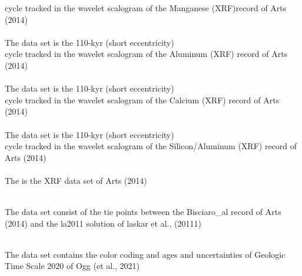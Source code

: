 \documentclass[a4paper]{book}
\begin{document}
\begin{Description}
cycle tracked in the wavelet scalogram of the Manganese (XRF)record of Arts (2014)\\{}
\\{}
The  data set is the 110-kyr (short eccentricity) \\{}
cycle tracked in the wavelet scalogram of the Aluminum (XRF) record of Arts (2014)\\{}
\\{}
The  data set is the 110-kyr (short eccentricity) \\{}
cycle tracked in the wavelet scalogram of the Calcium (XRF) record of Arts (2014)\\{}
\\{}
The  data set is the 110-kyr (short eccentricity) \\{}
cycle tracked in the wavelet scalogram of the Silicon/Aluminum (XRF) record of Arts (2014)\\{}
\\{}
The  is the XRF data set of Arts (2014)\\{}
\\{}

The  data set consist of the tie points between the
Bisciaro\_al record of Arts (2014) and the la2011 solution of laskar et al., (20111)\\{}
\\{}

The  data set contains the color coding and ages and uncertainties
of Geologic Time Scale 2020 of Ogg (et al., 2021)\\{}
\\{}
\end{Description}
%
\end{document}
